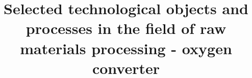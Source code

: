 \documentclass[]{tukediphc}
\title{Selected technological objects and processes in the field of raw materials processing - oxygen converter}
\begin{document}
\renewcommand{\figurename}{Obrázok}	
\renewcommand\theHfigure{\theHsection.\arabic{figure}}
\renewcommand\theHtable{\theHsection.\arabic{table}}


\prvastrana




%
%



\thispagestyle{empty}
\tableofcontents
\newpage

\thispagestyle{empty}

{	\makeatletter
	\renewcommand{\l@figure}{\@dottedtocline{1}{1.5em}{3.5em}}
	\makeatother
	\listoffigures}



\newpage

\thispagestyle{empty}
\newpage

\newpage
%
%
%

%

%

%
\newpage
{}
\protect\label{page:posledna}
\end{document}
